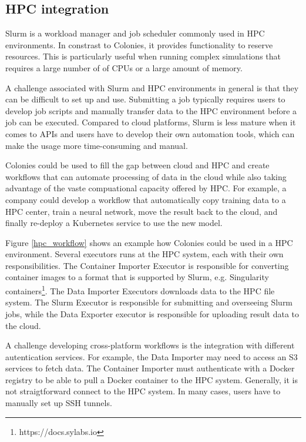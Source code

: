\documentclass{article}
\begin{document}
\subsection{HPC integration}
\label{hpc_use_case}
Slurm \cite{slurm} is a workload manager and job scheduler commonly used in HPC environments. In constrast to Colonies, it provides functionality to reserve resources. This is particularly useful when running complex simulations that requires a large number of of CPUs or a large amount of memory. 

A challenge associated with Slurm and HPC environments in general is that they can be difficult to set up and use. Submitting a job typically requires users to develop job scripts and manually transfer data to the HPC environment before a job can be executed. Compared to cloud platforms, Slurm is less mature when it comes to APIs and users have to develop their own automation tools, which can make the usage more time-consuming and manual.

Colonies could be used to fill the gap between cloud and HPC and create workflows that can automate processing of data in the cloud while also taking advantage of the vaste compuational capacity offered by HPC. For example, a company could develop a workflow that automatically copy training data to a HPC center, train a neural network, move the result back to the cloud, and finally re-deploy a Kubernetes service to use the new model.

Figure \ref{hpc_workflow} shows an example how Colonies could be used in a HPC environment. Several executors runs at the HPC system, each with their own responsibilities. The Container Importer Executor is responsible for converting container images to a format that is supported by Slurm, e.g. Singularity containers\footnote{https://docs.sylabs.io}. The Data Importer Executors downloads data to the HPC file system. The Slurm Executor is responsible for submitting and overseeing Slurm jobs, while the Data Exporter executor is responsible for uploading result data to the cloud.

A challenge developing cross-platform workflows is the integration with different autentication services. For example, the Data Importer may need to access an S3 services to fetch data. The Container Importer must authenticate with a Docker registry to be able to pull a Docker container to the HPC system. Generally, it is not straigtforward connect to the HPC system. In many cases, users have to manually set up SSH tunnels. 
\end{document}
